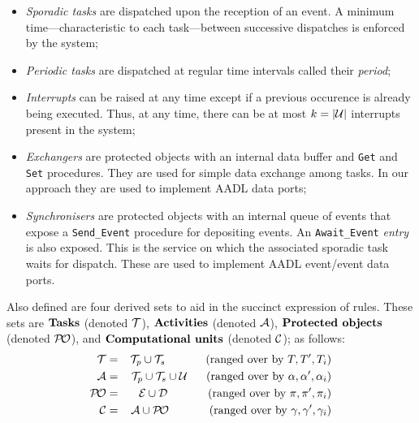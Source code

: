 \begin{itemize}
  \item{\emph{Sporadic tasks} are dispatched upon the reception of an
    event. A minimum time---characteristic to each task---between
    successive dispatches is enforced by the system;}
  \item{\emph{Periodic tasks} are dispatched at regular time intervals
    called their \emph{period};}
  \item{\emph{Interrupts} can be raised at any time except if a
    previous occurence is already being executed. Thus, at any time,
    there can be at most ${k=|\cal U|}$ interrupts present in the
    system;}
  \item{\emph{Exchangers} are protected objects with an internal data
    buffer and \texttt{Get} and \texttt{Set} procedures. They are used
    for simple data exchange among tasks. In our approach they are used
    to implement AADL data ports;}
  \item{\emph{Synchronisers} are protected objects with an internal
    queue of events that expose a \texttt{Send\_Event} procedure for
    depositing events. An \texttt{Await\_Event} \emph{entry} is also
    exposed. This is the service on which the associated sporadic task
    waits for dispatch. These are used to implement AADL event/event
    data ports.}
\end{itemize}

Also defined are four derived sets to aid in the succinct expression
of rules. These sets are $\text{\textbf{Tasks}}$ (denoted ${\cal T}$),
$\text{\textbf{Activities}}$ (denoted ${\cal A}$),
$\text{\textbf{Protected objects}}$ (denoted ${\cal P\!O}$), and
$\text{\textbf{Computational units}}$ (denoted ${\cal C}$); as
follows:
\begin{eqnarray}
  {\cal T} & = & {\cal T}_p\cup {\cal T}_s
  \ \ \ \ \ \ \ \ \ \ \: \text{(ranged over by} \ T, T', T_i \text{)} \nonumber \\
  {\cal A}  & =  & \, {\cal T}_p\cup {\cal T}_s \cup
  {\cal U} \ \ \ \ \ \text{(ranged over by} \ \alpha, \alpha',
  \alpha_i \text{)} \nonumber \\
  {\cal P\!O} & = & \ \, 
  {\cal E} \cup {\cal D} \ \ \ \ \ \: \ \ \ \ \ \text{(ranged over by} \ \pi, \pi',
  \pi_i \nonumber \text{)} \\
{\cal C} & = & {\cal A}
  \cup {\cal P\!O} \ \ \ \ \ \: \ \ \ \ \ \text{(ranged over by} \ \gamma, \gamma',
  \gamma_i \text{)} \nonumber
\end{eqnarray}

